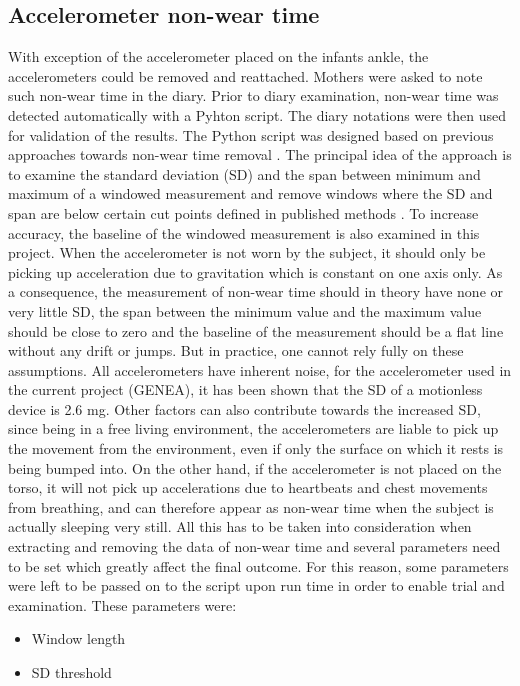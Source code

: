 \documentclass{article}
\begin{document}
{\subsection{Accelerometer non-wear time}
With exception of the accelerometer placed on the infants ankle, the accelerometers could be removed and reattached. Mothers were asked to note such non-wear time in the diary. Prior to diary examination, non-wear time was detected automatically with a Pyhton script. The diary notations were then used for validation of the results. The Python script was designed based on previous approaches towards non-wear time removal \cite{ref2}. The principal idea of the approach is to examine the standard deviation (SD) and the span between minimum and maximum of a windowed measurement and remove windows where the SD and span are below certain cut points defined in published methods \cite{ref2}. To increase accuracy, the baseline of the windowed measurement is also examined in this project. When the accelerometer is not worn by the subject, it should only be picking up acceleration due to gravitation which is constant on one axis only. As a consequence, the measurement of non-wear time should in theory have none or very little SD, the span between the minimum value and the maximum value should be close to zero and the baseline of the measurement should be a flat line without any drift or jumps. But in practice, one cannot rely fully on these assumptions. All accelerometers have inherent noise, for the accelerometer used in the current project (GENEA), it has been shown that the SD of a motionless device is 2.6 mg. Other factors can also contribute towards the increased SD, since being in a free living environment, the accelerometers are liable to pick up the movement from the environment, even if only the surface on which it rests is being bumped into. On the other hand, if the accelerometer is not placed on the torso, it will not pick up accelerations due to heartbeats and chest movements from breathing, and can therefore appear as non-wear time when the subject is actually sleeping very still. All this has to be taken into consideration when extracting and removing the data of non-wear time and several parameters need to be set which greatly affect the final outcome. For this reason, some parameters were left to be passed on to the script upon run time in order to enable trial and examination. These parameters were: 
\begin{itemize}
\item Window length
\item SD threshold

\end{itemize}}
\end{document}
